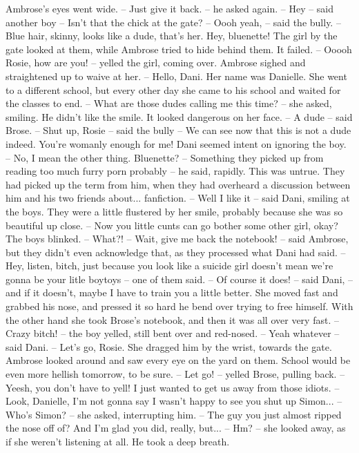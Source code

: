 Ambrose's eyes went wide.
-- Just give it back. -- he asked again.
-- Hey -- said another boy -- Isn't that the chick at the gate?
-- Oooh yeah, -- said the bully. -- Blue hair, skinny, looks like a dude, that's her. Hey, bluenette!
The girl by the gate looked at them, while Ambrose tried to hide behind them. It failed.
-- Ooooh Rosie, how are you! -- yelled the girl, coming over.
Ambrose sighed and straightened up to waive at her.
-- Hello, Dani.
Her name was Danielle. She went to a different school, but every other day she came to his school and waited for the classes to end.
-- What are those dudes calling me this time? -- she asked, smiling. He didn't like the smile. It looked dangerous on her face.
-- A dude -- said Brose.
-- Shut up, Rosie -- said the bully -- We can see now that this is not a dude indeed. You're womanly enough for me!
Dani seemed intent on ignoring the boy.
-- No, I mean the other thing. Bluenette?
-- Something they picked up from reading too much furry porn probably -- he said, rapidly. This was untrue. They had picked up the term from him,
when they had overheard a discussion between him and his two friends about... fanfiction.
-- Well I like it -- said Dani, smiling at the boys. They were a little flustered by her smile, probably because she was so beautiful up close. -- Now you little cunts can go bother some
other girl, okay?
The boys blinked.
-- What?!
-- Wait, give me back the notebook! -- said Ambrose, but they didn't even acknowledge that, as they processed what Dani had said.
-- Hey, listen, bitch, just because you look like a suicide girl doesn't mean we're gonna be your litle boytoys -- one of them said.
-- Of course it does! -- said Dani, -- and if it doesn't, maybe I have to train you a little better.
She moved fast and grabbed his nose, and pressed it so hard he bend over trying to free himself. With the other hand she took Brose's notebook, and then it was all over very fast.
-- Crazy bitch! -- the boy yelled, still bent over and red-nosed.
-- Yeah whatever -- said Dani. -- Let's go, Rosie.
She dragged him by the wrist, towards the gate. Ambrose looked around and saw every eye on the yard on them. School would be even more hellish tomorrow, to be sure.
-- Let go! -- yelled Brose, pulling back.
-- Yeesh, you don't have to yell! I just wanted to get us away from those idiots.
-- Look, Danielle, I'm not gonna say I wasn't happy to see you shut up Simon...
-- Who's Simon? -- she asked, interrupting him.
-- The guy you just almost ripped the nose off of? And I'm glad you did, really, but...
-- Hm? -- she looked away, as if she weren't listening at all. He took a deep breath.
